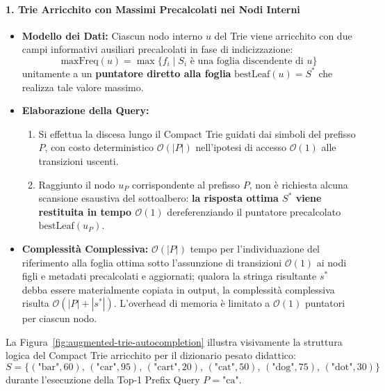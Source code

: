 \paragraph{1. Trie Arricchito con Massimi Precalcolati nei Nodi Interni}
\begin{itemize}
  \item \textbf{Modello dei Dati:} Ciascun nodo interno $u$ del Trie viene arricchito con due campi informativi ausiliari precalcolati in fase di indicizzazione:
  \begin{equation}
    \text{maxFreq}(u) = \max \{ f_i \mid S_i \text{ \`e una foglia discendente di } u \}
  \end{equation}
  unitamente a un \textbf{puntatore diretto alla foglia} $\text{bestLeaf}(u) = S^*$ che realizza tale valore massimo.
  \item \textbf{Elaborazione della Query:}
  \begin{enumerate}
    \item Si effettua la discesa lungo il Compact Trie guidati dai simboli del prefisso $P$, con costo deterministico $\mathcal{O}(|P|)$ nell'ipotesi di accesso $\mathcal{O}(1)$ alle transizioni uscenti.
    \item Raggiunto il nodo $u_P$ corrispondente al prefisso $P$, non \`e richiesta alcuna scansione esaustiva del sottoalbero: \textbf{la risposta ottima $S^*$ viene restituita in tempo $\mathcal{O}(1)$} dereferenziando il puntatore precalcolato $\text{bestLeaf}(u_P)$.
  \end{enumerate}
  \item \textbf{Complessit\`a Complessiva:} $\mathcal{O}(|P|)$ tempo per l'individuazione del riferimento alla foglia ottima sotto l'assunzione di transizioni $\mathcal{O}(1)$ ai nodi figli e metadati precalcolati e aggiornati; qualora la stringa risultante $s^*$ debba essere materialmente copiata in output, la complessit\`a complessiva risulta $\mathcal{O}(|P| + |s^*|)$. L'overhead di memoria \`e limitato a $\mathcal{O}(1)$ puntatori per ciascun nodo.
\end{itemize}

La Figura~\ref{fig:augmented-trie-autocompletion} illustra visivamente la struttura logica del Compact Trie arricchito per il dizionario pesato didattico:
\begin{equation}
  S = \{ (\text{"bar"}, 60), \, (\text{"car"}, 95), \, (\text{"cart"}, 20), \, (\text{"cat"}, 50), \, (\text{"dog"}, 75), \, (\text{"dot"}, 30) \}
\end{equation}
durante l'esecuzione della Top-1 Prefix Query $P = \text{"ca"}$.

